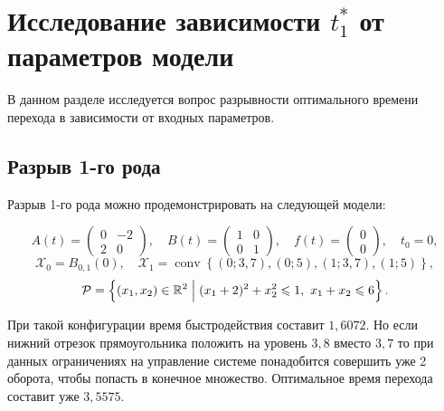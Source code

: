 \documentclass[12pt, a4paper]{article} %
\renewcommand{\le}{\leqslant}
\newcommand{\Real}{\mathbb{R}}
\DeclareMathOperator{\conv}{conv}
\begin{document}
\section{Исследование зависимости $t_1^*$ от параметров модели}

В данном разделе исследуется вопрос разрывности оптимального 
времени перехода в зависимости от входных параметров. 

\subsection{Разрыв 1-го рода}

Разрыв 1-го рода можно продемонстрировать на следующей модели:

\[
    A(t) = 
    \left(\begin{array}{cc}
            0 &-2 \\
            2 & 0
    \end{array}\right), \quad 
    B(t) = \left(
    \begin{array}{cc}
        1 & 0 \\
        0 & 1
    \end{array} \right), \quad 
    f(t) = \left( 
        \begin{array}{cc}
        0 \\ 0
    \end{array} 
    \right), \quad t_0 = 0,
\]
\[
    \mathcal{X}_0 = B_{0{,}1}\left( 0\right), \quad
    \mathcal{X}_1 = \conv \left\{ 
        (0; 3{,}7), (0; 5), (1; 3{,}7), (1; 5)
    \right\}
,\] 
\[
    \mathcal{P} = \left\{ (x_1, x_2) \in \Real^2 \Bigm| 
        (x_1 + 2)^2 + x_2^2 \le 1,\
    x_1 + x_2 \le 6\right\}
.\] 

При такой конфигурации время быстродействия составит $1{,}6072$.
Но если нижний отрезок прямоугольника положить на уровень  $3{,}8$ вместо 
$3{,7}$ то при данных ограничениях на управление системе понадобится
совершить уже 2 оборота, чтобы попасть в конечное множество.
Оптимальное время перехода составит уже  $3{,}5575$.
\end{document}
